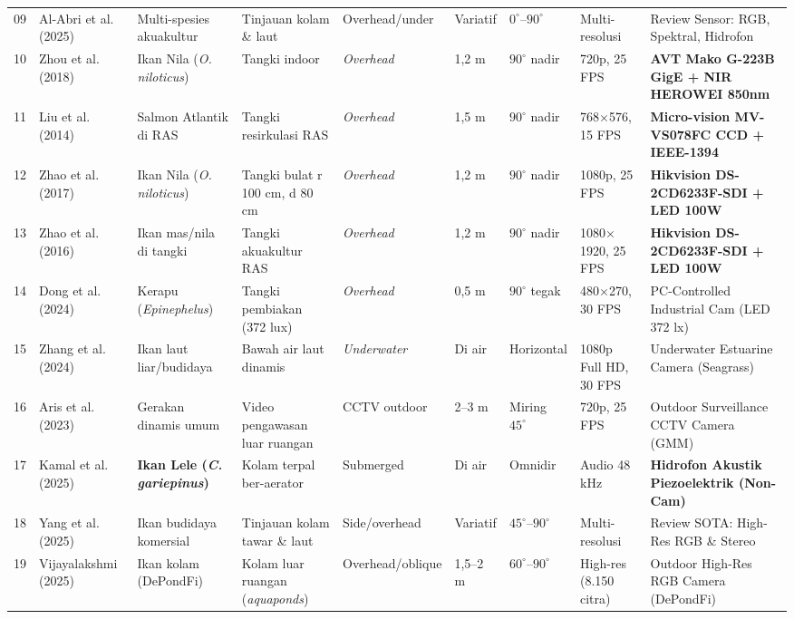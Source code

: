 \documentclass[10pt,a4paper]{article}
\begin{document}
{\begin{longtable}{@{}p{0.35cm} p{2.5cm} p{2.2cm} p{2.0cm} p{1.3cm} p{0.75cm} p{1.05cm} p{2.0cm} p{3.8cm}@{}}
09 & Al-Abri et al. (2025) & Multi-spesies akuakultur & Tinjauan kolam \& laut & Overhead/under & Variatif & $0^\circ\text{--}90^\circ$ & Multi-resolusi & Review Sensor: RGB, Spektral, Hidrofon \\
10 & Zhou et al. (2018) & Ikan Nila (\textit{O. niloticus}) & Tangki indoor & \textit{Overhead} & 1,2 m & $90^\circ$ nadir & 720p, 25 FPS & \textbf{AVT Mako G-223B GigE + NIR HEROWEI 850nm} \\
11 & Liu et al. (2014) & Salmon Atlantik di RAS & Tangki resirkulasi RAS & \textit{Overhead} & 1,5 m & $90^\circ$ nadir & 768$\times$576, 15 FPS & \textbf{Micro-vision MV-VS078FC CCD + IEEE-1394} \\
12 & Zhao et al. (2017) & Ikan Nila (\textit{O. niloticus}) & Tangki bulat r 100 cm, d 80 cm & \textit{Overhead} & 1,2 m & $90^\circ$ nadir & 1080p, 25 FPS & \textbf{Hikvision DS-2CD6233F-SDI + LED 100W} \\
13 & Zhao et al. (2016) & Ikan mas/nila di tangki & Tangki akuakultur RAS & \textit{Overhead} & 1,2 m & $90^\circ$ nadir & 1080$\times$1920, 25 FPS & \textbf{Hikvision DS-2CD6233F-SDI + LED 100W} \\
14 & Dong et al. (2024) & Kerapu (\textit{Epinephelus}) & Tangki pembiakan (372 lux) & \textit{Overhead} & 0,5 m & $90^\circ$ tegak & 480$\times$270, 30 FPS & PC-Controlled Industrial Cam (LED 372 lx) \\
15 & Zhang et al. (2024) & Ikan laut liar/budidaya & Bawah air laut dinamis & \textit{Underwater} & Di air & Horizontal & 1080p Full HD, 30 FPS & Underwater Estuarine Camera (Seagrass) \\
16 & Aris et al. (2023) & Gerakan dinamis umum & Video pengawasan luar ruangan & CCTV outdoor & 2--3 m & Miring $45^\circ$ & 720p, 25 FPS & Outdoor Surveillance CCTV Camera (GMM) \\
17 & Kamal et al. (2025) & \textbf{Ikan Lele (\textit{C. gariepinus})} & Kolam terpal ber-aerator & Submerged & Di air & Omnidir & Audio 48 kHz & \textbf{Hidrofon Akustik Piezoelektrik (Non-Cam)} \\
18 & Yang et al. (2025) & Ikan budidaya komersial & Tinjauan kolam tawar \& laut & Side/overhead & Variatif & $45^\circ\text{--}90^\circ$ & Multi-resolusi & Review SOTA: High-Res RGB \& Stereo \\
19 & Vijayalakshmi (2025) & Ikan kolam (DePondFi) & Kolam luar ruangan (\textit{aquaponds}) & Overhead/oblique & 1,5--2 m & $60^\circ\text{--}90^\circ$ & High-res (8.150 citra) & Outdoor High-Res RGB Camera (DePondFi) \\

\end{longtable}}
\end{document}
